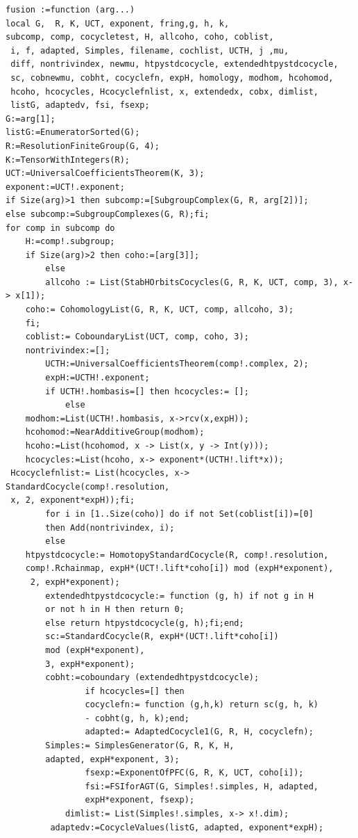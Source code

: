 \documentclass[a4paper, 10pt]{book}
\theoremstyle{definition}
\numberwithin{equation}{chapter}
\begin{document}
\begin{lstlisting}
fusion :=function (arg...)
local G,  R, K, UCT, exponent, fring,g, h, k,  
subcomp, comp, cocycletest, H, allcoho, coho, coblist,
 i, f, adapted, Simples, filename, cochlist, UCTH, j ,mu, 
 diff, nontrivindex, newmu, htpystdcocycle, extendedhtpystdcocycle, 
 sc, cobnewmu, cobht, cocyclefn, expH, homology, modhom, hcohomod, 
 hcoho, hcocycles, Hcocyclefnlist, x, extendedx, cobx, dimlist, 
 listG, adaptedv, fsi, fsexp;
G:=arg[1];
listG:=EnumeratorSorted(G);
R:=ResolutionFiniteGroup(G, 4);
K:=TensorWithIntegers(R);
UCT:=UniversalCoefficientsTheorem(K, 3);
exponent:=UCT!.exponent;
if Size(arg)>1 then subcomp:=[SubgroupComplex(G, R, arg[2])]; 
else subcomp:=SubgroupComplexes(G, R);fi;
for comp in subcomp do
    H:=comp!.subgroup;
    if Size(arg)>2 then coho:=[arg[3]];
        else
    	allcoho := List(StabHOrbitsCocycles(G, R, K, UCT, comp, 3), x-> x[1]);
    coho:= CohomologyList(G, R, K, UCT, comp, allcoho, 3);
    fi;
    coblist:= CoboundaryList(UCT, comp, coho, 3);
	nontrivindex:=[];
        UCTH:=UniversalCoefficientsTheorem(comp!.complex, 2);
        expH:=UCTH!.exponent;
        if UCTH!.hombasis=[] then hcocycles:= [];
            else
	modhom:=List(UCTH!.hombasis, x->rcv(x,expH));
	hcohomod:=NearAdditiveGroup(modhom);
	hcoho:=List(hcohomod, x -> List(x, y -> Int(y)));
	hcocycles:=List(hcoho, x-> exponent*(UCTH!.lift*x));
 Hcocyclefnlist:= List(hcocycles, x-> StandardCocycle(comp!.resolution, 
 x, 2, exponent*expH));fi;
        for i in [1..Size(coho)] do if not Set(coblist[i])=[0] 
        then Add(nontrivindex, i); 
        else
	htpystdcocycle:= HomotopyStandardCocycle(R, comp!.resolution, 
	comp!.Rchainmap, expH*(UCT!.lift*coho[i]) mod (expH*exponent),
	 2, expH*exponent);
		extendedhtpystdcocycle:= function (g, h) if not g in H 
		or not h in H then return 0; 
		else return htpystdcocycle(g, h);fi;end;
		sc:=StandardCocycle(R, expH*(UCT!.lift*coho[i]) 
		mod (expH*exponent), 
		3, expH*exponent);
		cobht:=coboundary (extendedhtpystdcocycle);
                if hcocycles=[] then    	
          	    cocyclefn:= function (g,h,k) return sc(g, h, k) 
          	    - cobht(g, h, k);end;
                adapted:= AdaptedCocycle1(G, R, H, cocyclefn);
		Simples:= SimplesGenerator(G, R, K, H, 
		adapted, expH*exponent, 3);
                fsexp:=ExponentOfPFC(G, R, K, UCT, coho[i]);
                fsi:=FSIforAGT(G, Simples!.simples, H, adapted, 
                expH*exponent, fsexp);
	        dimlist:= List(Simples!.simples, x-> x!.dim);
         adaptedv:=CocycleValues(listG, adapted, exponent*expH);

\end{lstlisting}
\end{document}
